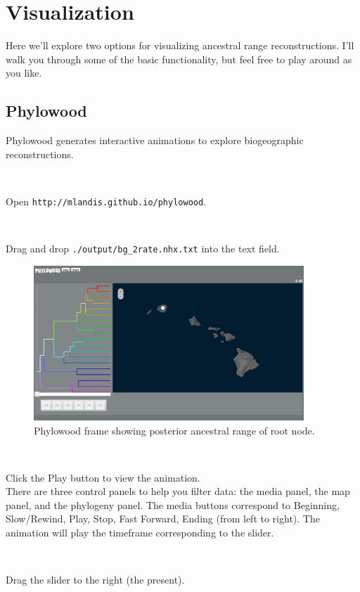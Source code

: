 \documentclass[11pt]{article}
\newcommand{\impmark}{\strut\vadjust{\domark}}
\newcommand{\domark}{%
  \vbox to 0pt{
    \kern-\dp\strutbox
    \smash{\llap{$\rightarrow$\kern1em}}
    \vss
  }%
}
\begin{document}
\section{Visualization}

Here we'll explore two options for visualizing ancestral range reconstructions.
I'll walk you through some of the basic functionality, but feel free to play around as you like.

\subsection{Phylowood}

Phylowood generates interactive animations to explore biogeographic reconstructions.

\noindent \\ \impmark Open \texttt{http://mlandis.github.io/phylowood}.

\noindent \\ \impmark Drag and drop \texttt{./output/bg\_2rate.nhx.txt} into the text field.

\begin{figure}[H]
\centering
\includegraphics[width=4in]{figures/phw_mrca}
\caption{Phylowood frame showing posterior ancestral range of root node.}
\end{figure}

\noindent \\ \impmark Click the Play button to view the animation. \\

There are three control panels to help you filter data: the media panel, the map panel, and the phylogeny panel.
The media buttons correspond to Beginning, Slow/Rewind, Play, Stop, Fast Forward, Ending (from left to right).
The animation will play the timeframe corresponding to the slider.

\noindent \\ \impmark Drag the slider to the right (the present).
\end{document}

